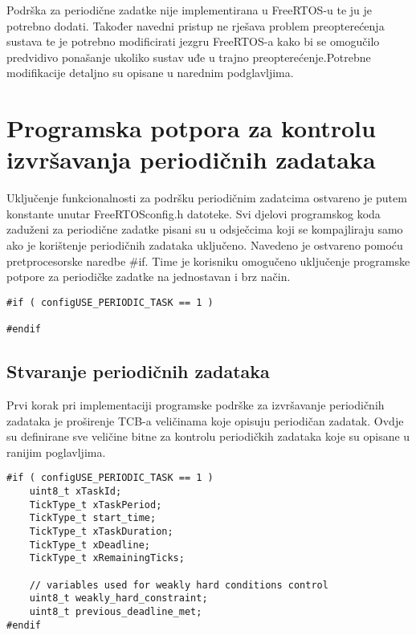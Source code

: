 \documentclass[../zavrsni.tex]{subfiles}
\begin{document}
Podrška za periodične zadatke nije implementirana u FreeRTOS-u te ju je potrebno dodati.
Također navedni pristup ne rješava problem preopterećenja sustava te je potrebno modificirati jezgru FreeRTOS-a kako bi se omogučilo 
predvidivo ponašanje ukoliko sustav uđe u trajno preopterećenje.Potrebne modifikacije detaljno su opisane u narednim podglavljima.

\section{Programska potpora za kontrolu izvršavanja periodičnih zadataka}

Uključenje funkcionalnosti za podršku periodičnim zadatcima ostvareno je putem konstante unutar FreeRTOSconfig.h datoteke.
Svi djelovi programskog koda zaduženi za periodične zadatke pisani su u odsječcima koji se kompajliraju samo ako je korištenje
periodičnih zadataka uključeno. Navedeno je ostvareno pomoću pretprocesorske naredbe \#if. Time je korisniku omogučeno uključenje
programske potpore za periodičke zadatke na jednostavan i brz način.
\begin{lstlisting}[style=CStyle,caption={Pretprocesorska naredba za uključenje periodičnih zadataka},captionpos=b]
#if ( configUSE_PERIODIC_TASK == 1 )

#endif
\end{lstlisting}

\subsection{Stvaranje periodičnih zadataka}

Prvi korak pri implementaciji programske podrške za izvršavanje periodičnih zadataka je proširenje TCB-a veličinama koje opisuju 
periodičan zadatak. Ovdje su definirane sve veličine bitne za kontrolu periodičkih zadataka koje su opisane u ranijim poglavljima.

\begin{lstlisting}[style=CStyle,caption={Varijable dodane u strukturu za kontrolu zadataka},captionpos=b]
#if ( configUSE_PERIODIC_TASK == 1 )
    uint8_t xTaskId;
    TickType_t xTaskPeriod;
    TickType_t start_time;
    TickType_t xTaskDuration;
    TickType_t xDeadline;
    TickType_t xRemainingTicks;
    
    // variables used for weakly hard conditions control
    uint8_t weakly_hard_constraint;
    uint8_t previous_deadline_met;
#endif
\end{lstlisting}
\end{document}
